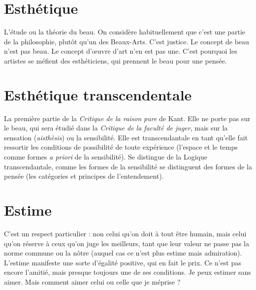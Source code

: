 \section{Esthétique}
L’étude ou la théorie du beau. On considère habituellement
que c’est une partie de la philosophie, plutôt qu'un des
Beaux-Arts. C’est justice. Le concept de beau n’est pas beau. Le concept
d'œuvre d’art n’en est pas une. C’est pourquoi les artistes se méfient des esthéticiens,
qui prennent le beau pour une pensée.

\section{Esthétique transcendentale}
La première partie de la {\it Critique
de la raison pure} de Kant. Elle ne
porte pas sur le beau, qui sera étudié dans la {\it Critique de la faculté de juger}, mais
sur la sensation ({\it aisthèsis}) ou la sensibilité. Elle est transcendantale en tant
qu’elle fait ressortir les conditions de possibilité de toute expérience (l’espace et
le temps comme formes {\it a priori} de la sensibilité). Se distingue de la Logique
transcendantale, comme les formes de la sensibilité se distinguent des formes de
la pensée (les catégories et principes de l’entendement).

\section{Estime}
C’est un respect particulier : non celui qu’on doit à tout être
humain, mais celui qu’on réserve à ceux qu’on juge les meilleurs,
tant que leur valeur ne passe pas la norme commune ou la nôtre (auquel cas ce
n'est plus estime mais admiration). L’estime manifeste une sorte d'égalité positive,
qui en fait le prix. Ce n’est pas encore l’amitié, mais presque toujours une
de ses conditions. Je peux estimer sans aimer. Mais comment aimer celui ou
celle que je méprise ?

